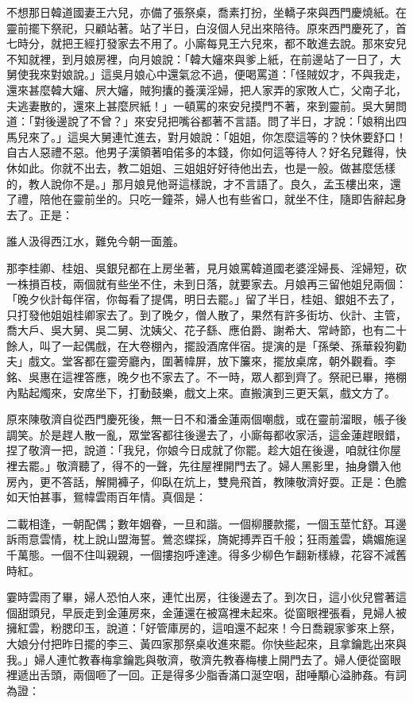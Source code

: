 不想那日韓道國妻王六兒，亦備了張祭桌，喬素打扮，坐轎子來與西門慶燒紙。在靈前擺下祭祀，只顧站著。站了半日，白沒個人兒出來陪待。原來西門慶死了，首七時分，就把王經打發家去不用了。小廝每見王六兒來，都不敢進去說。那來安兒不知就裡，到月娘房裡，向月娘說：「韓大嬸來與爹上紙，在前邊站了一日了，大舅使我來對娘說。」這吳月娘心中還氣忿不過，便喝罵道：「怪賊奴才，不與我走，還來甚麼韓大嬸、屄大嬸，賊狗攮的養漢淫婦，把人家弄的家敗人亡，父南子北，夫逃妻散的，還來上甚麼屄紙！」一頓罵的來安兒摸門不著，來到靈前。吳大舅問道：「對後邊說了不曾？」來安兒把嘴谷都著不言語。問了半日，才說：「娘稍出四馬兒來了。」這吳大舅連忙進去，對月娘說：「姐姐，你怎麼這等的？快休要舒口！自古人惡禮不惡。他男子漢領著咱偌多的本錢，你如何這等待人？好名兒難得，快休如此。你就不出去，教二姐姐、三姐姐好好待他出去，也是一般。做甚麼恁樣的，教人說你不是。」那月娘見他哥這樣說，才不言語了。良久，孟玉樓出來，還了禮，陪他在靈前坐的。只吃一鐘茶，婦人也有些省口，就坐不住，隨即告辭起身去了。正是：

誰人汲得西江水，難免今朝一面羞。

那李桂卿、桂姐、吳銀兒都在上房坐著，見月娘罵韓道國老婆淫婦長、淫婦短，砍一株損百枝，兩個就有些坐不住，未到日落，就要家去。月娘再三留他姐兒兩個： 「晚夕伙計每伴宿，你每看了提偶，明日去罷。」留了半日，桂姐、銀姐不去了，只打發他姐姐桂卿家去了。到了晚夕，僧人散了，果然有許多街坊、伙計、主管，喬大戶、吳大舅、吳二舅、沈姨父、花子繇、應伯爵、謝希大、常峙節，也有二十餘人，叫了一起偶戲，在大卷棚內，擺設酒席伴宿。提演的是「孫榮、孫華殺狗勸夫」戲文。堂客都在靈旁廳內，圍著幃屏，放下簾來，擺放桌席，朝外觀看。李銘、吳惠在這裡答應，晚夕也不家去了。不一時，眾人都到齊了。祭祀已畢，捲棚內點起燭來，安席坐下，打動鼓樂，戲文上來。直搬演到三更天氣，戲文方了。

原來陳敬濟自從西門慶死後，無一日不和潘金蓮兩個嘲戲，或在靈前溜眼，帳子後調笑。於是趕人散一亂，眾堂客都往後邊去了，小廝每都收家活，這金蓮趕眼錯，捏了敬濟一把，說道：「我兒，你娘今日成就了你罷。趁大姐在後邊，咱就往你屋裡去罷。」敬濟聽了，得不的一聲，先往屋裡開門去了。婦人黑影里，抽身鑽入他房內，更不答話，解開褲子，仰臥在炕上，雙鳧飛首，教陳敬濟好耍。正是：色膽如天怕甚事，鴛幃雲雨百年情。真個是：

二載相逢，一朝配偶；數年姻眷，一旦和諧。一個柳腰款擺，一個玉莖忙舒。耳邊訴雨意雲情，枕上說山盟海誓。鶯恣蝶採，旖妮搏弄百千般；狂雨羞雲，嬌媚施逞千萬態。一個不住叫親親，一個摟抱呼達達。得多少柳色乍翻新樣綠，花容不減舊時紅。

霎時雲雨了畢，婦人恐怕人來，連忙出房，往後邊去了。到次日，這小伙兒嘗著這個甜頭兒，早辰走到金蓮房來，金蓮還在被窩裡未起來。從窗眼裡張看，見婦人被擁紅雲，粉腮印玉，說道：「好管庫房的，這咱還不起來！今日喬親家爹來上祭，大娘分付把昨日擺的李三、黃四家那祭桌收進來罷。你快些起來，且拿鑰匙出來與我。」婦人連忙教春梅拿鑰匙與敬濟，敬濟先教春梅樓上開門去了。婦人便從窗眼裡遞出舌頭，兩個咂了一回。正是得多少脂香滿口涎空咽，甜唾顒心溢肺姦。有詞為證：

